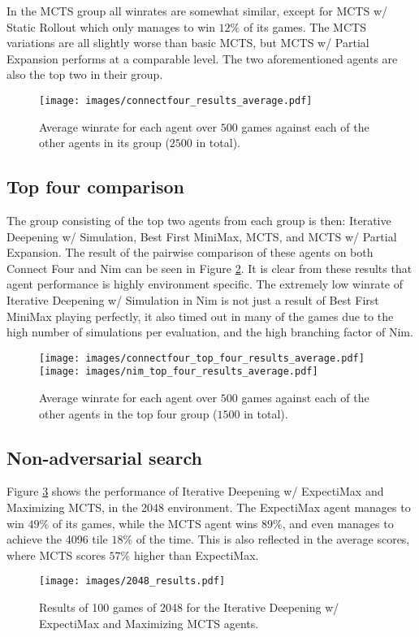 In the MCTS group all winrates are somewhat similar, except for MCTS w/ Static Rollout which only manages to win $12\%$ of its games. The MCTS variations are all slightly worse than basic MCTS, but MCTS w/ Partial Expansion performs at a comparable level. The two aforementioned agents are also the top two in their group. 

\begin{figure}[H]
    \centering
    \texttt{[image: images/connectfour\_results\_average.pdf]}
    \caption{Average winrate for each agent over $500$ games against each of
    the other agents in its group ($2500$ in total).}
    \label{fig:c4_results_average} 
\end{figure}

\subsection{Top four comparison}
The group consisting of the top two agents from each group is then: Iterative Deepening w/ Simulation, Best First MiniMax, MCTS, and MCTS w/ Partial Expansion. The result of the pairwise comparison of these agents on both Connect Four and Nim can be seen in Figure \ref{fig:top_four_results_average}. It is clear from these results that agent performance is highly environment specific. The extremely low winrate of Iterative Deepening w/ Simulation in Nim is not just a result of Best First MiniMax playing perfectly, it also timed out in many of the games due to the high number of simulations per evaluation, and the high branching factor of Nim. 

\begin{figure}[H]
    \centering
    \texttt{[image: images/connectfour\_top\_four\_results\_average.pdf]}
    \texttt{[image: images/nim\_top\_four\_results\_average.pdf]}
    \caption{Average winrate for each agent over $500$ games against each of
    the other agents in the top four group ($1500$ in total).}
    \label{fig:top_four_results_average}
\end{figure}

\newpage
\subsection{Non-adversarial search}
Figure \ref{fig:2048_results} shows the performance of Iterative Deepening w/ ExpectiMax and Maximizing MCTS, in the 2048 environment. The ExpectiMax agent manages to win $49\%$ of its games, while the MCTS agent wins $89\%$, and even manages to achieve the 4096 tile $18\%$ of the time. This is also reflected in the average scores, where MCTS scores $57\%$ higher than ExpectiMax.

\begin{figure}[H]
    \centering
    \texttt{[image: images/2048\_results.pdf]}
    \caption{Results of 100 games of 2048 for the Iterative Deepening w/ ExpectiMax and Maximizing MCTS agents.}
    \label{fig:2048_results}
\end{figure}
